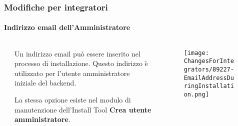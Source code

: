 \begin{frame}[fragile]
	\frametitle{Modifiche per integratori}
	\framesubtitle{Indirizzo email dell'Amministratore}

	\begin{columns}[T]
		\begin{column}{.04\textwidth}
		\end{column}
		\begin{column}{.38\textwidth}

			Un indirizzo email può essere inserito nel processo di installazione.
			Questo indirizzo è utilizzato per l'utente amministratore iniziale del backend.
			\vspace{0.2cm}

			La stessa opzione esiste nel modulo di manutenzione dell'Install Tool
			\textbf{Crea utente amministratore}.

		\end{column}
		\begin{column}{.58\textwidth}
			\vspace{-0.3cm}
			\begin{figure}
				\texttt{[image: ChangesForIntegrators/89227-EmailAddressDuringInstallation.png]}
			\end{figure}
		\end{column}
	\end{columns}

\end{frame}



